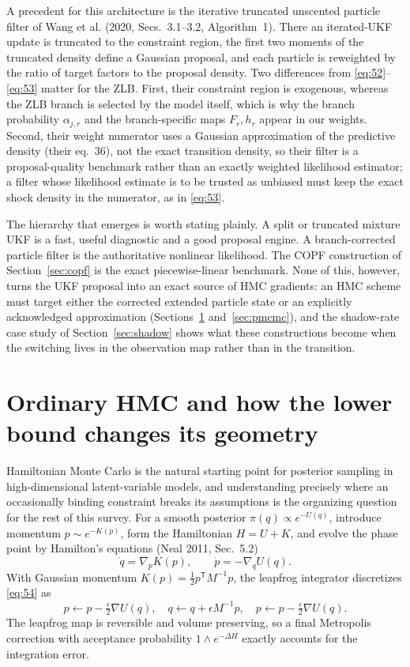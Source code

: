 \documentclass[11pt]{article}
\begin{document}
A precedent for this architecture is the iterative truncated unscented
particle filter of Wang et al. (2020, Secs.~3.1--3.2, Algorithm~1). There an
iterated-UKF update is truncated to the constraint region, the first two
moments of the truncated density define a Gaussian proposal, and each
particle is reweighted by the ratio of target factors to the proposal
density. Two differences from \eqref{eq:52}--\eqref{eq:53} matter for the
ZLB. First, their constraint region is exogenous, whereas the ZLB branch is
selected by the model itself, which is why the branch probability
$\alpha_{j,r}$ and the branch-specific maps $F_r,h_r$ appear in our weights.
Second, their weight numerator uses a Gaussian approximation of the
predictive density (their eq.~36), not the exact transition density, so
their filter is a proposal-quality benchmark rather than an exactly weighted
likelihood estimator; a filter whose likelihood estimate is to be trusted as
unbiased must keep the exact shock density in the numerator, as in
\eqref{eq:53}.

The hierarchy that emerges is worth stating plainly. A split or truncated
mixture UKF is a fast, useful diagnostic and a good proposal engine. A
branch-corrected particle filter is the authoritative nonlinear likelihood.
The COPF construction of Section~\ref{sec:copf} is the exact
piecewise-linear benchmark. None of this, however, turns the UKF proposal
into an exact source of HMC gradients: an HMC scheme must target either the
corrected extended particle state or an explicitly acknowledged
approximation (Sections~\ref{sec:hmc} and~\ref{sec:pmcmc}), and the
shadow-rate case study of Section~\ref{sec:shadow} shows what these
constructions become when the switching lives in the observation map
rather than in the transition.

\section{Ordinary HMC and how the lower bound changes its geometry}\label{sec:hmc}

Hamiltonian Monte Carlo is the natural starting point for posterior sampling
in high-dimensional latent-variable models, and understanding precisely where
an occasionally binding constraint breaks its assumptions is the organizing
question for the rest of this survey. For a smooth posterior
$\pi(q)\propto e^{-U(q)}$, introduce momentum $p\sim e^{-K(p)}$, form the
Hamiltonian $H=U+K$, and evolve the phase point by Hamilton's equations
(Neal 2011, Sec.~5.2)
\begin{equation}\label{eq:54}
 \dot q=\nabla_pK(p),\qquad \dot p=-\nabla_qU(q).
\end{equation}
With Gaussian momentum $K(p)=\frac12p^{\mathsf T}M^{-1}p$, the leapfrog
integrator discretizes \eqref{eq:54} as
\begin{equation}\label{eq:55}
 p\leftarrow p-\tfrac\epsilon2\nabla U(q),\quad
 q\leftarrow q+\epsilon M^{-1}p,\quad
 p\leftarrow p-\tfrac\epsilon2\nabla U(q).
\end{equation}
The leapfrog map is reversible and volume preserving, so a final Metropolis
correction with acceptance probability $1\wedge e^{-\Delta H}$ exactly
accounts for the integration error.
\end{document}
